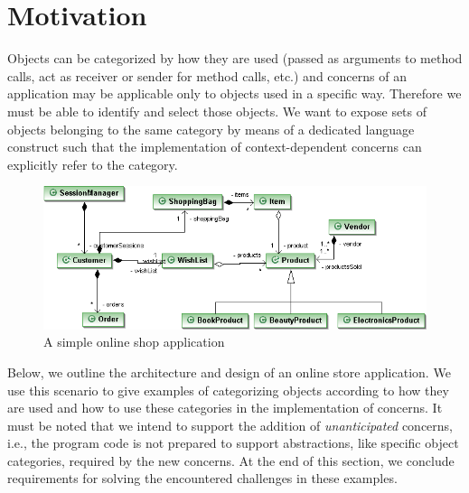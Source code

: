 \section{Motivation}
\label{sect:motivation}

Objects can be categorized by how they are used (passed as arguments to method calls, act as receiver or sender for method calls, etc.) and concerns of an application may be applicable only to objects used in a specific way.
Therefore we must be able to identify and select those objects.
We want to expose sets of objects belonging to the same category by means of a dedicated language construct such that the implementation of context-dependent concerns can explicitly refer to the category.

\begin{figure}[h]
\includegraphics[width=\textwidth]{images/myonlineshop.png}%
\caption{A simple online shop application}%
\label{fig:shop}%
\end{figure}

Below, we outline the architecture and design of an online store application. We use this scenario to give examples of categorizing objects according to how they are used and how to use these categories in the implementation of concerns. It must be noted that we intend to support the addition of \emph{unanticipated} concerns, i.e., the program code is not prepared to support abstractions, like specific object categories, required by the new concerns.
At the end of this section, we conclude requirements for solving the encountered challenges in these examples.

